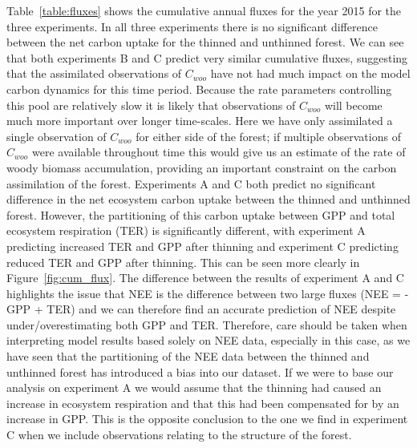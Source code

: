 Table~\ref{table:fluxes} shows the cumulative annual fluxes for the year 2015 for the three experiments. In all three experiments there is no significant difference between the net carbon uptake for the thinned and unthinned forest. We can see that both experiments B and C predict very similar cumulative fluxes, suggesting that the assimilated observations of \(C_{woo}\) have not had much impact on the model carbon dynamics for this time period. Because the rate parameters controlling this pool are relatively slow it is likely that observations of \(C_{woo}\) will become much more important over longer time-scales. Here we have only assimilated a single observation of \(C_{woo}\) for either side of the forest; if multiple observations of \(C_{woo}\) were available throughout time this would give us an estimate of the rate of woody biomass accumulation, providing an important constraint on the carbon assimilation of the forest. Experiments A and C both predict no significant difference in the net ecosystem carbon uptake between the thinned and unthinned forest. However, the partitioning of this carbon uptake between GPP and total ecosystem respiration (TER) is significantly different, with experiment A predicting increased TER and GPP after thinning and experiment C predicting reduced TER and GPP after thinning. This can be seen more clearly in Figure~\ref{fig:cum_flux}. The difference between the results of experiment A and C highlights the issue that NEE is the difference between two large fluxes (NEE = -GPP + TER) and we can therefore find an accurate prediction of NEE despite under/overestimating both GPP and TER. Therefore, care should be taken when interpreting model results based solely on NEE data, especially in this case, as we have seen that the partitioning of the NEE data between the thinned and unthinned forest has introduced a bias into our dataset. If we were to base our analysis on experiment A we would assume that the thinning had caused an increase in ecosystem respiration and that this had been compensated for by an increase in GPP. This is the opposite conclusion to the one we find in experiment C when we include observations relating to the structure of the forest. 


